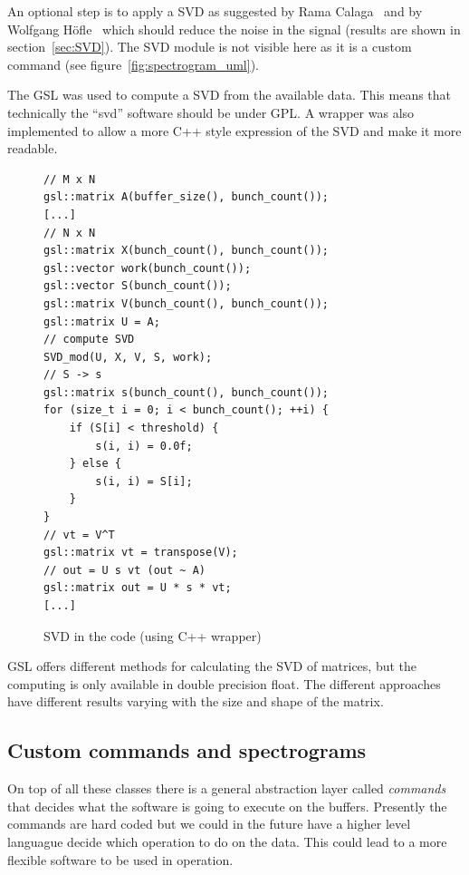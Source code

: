 An optional step is to apply a \gls{SVD} as suggested by Rama Calaga~\cite{PhysRevSTAB.7.042801} and by Wolfgang H{\"o}f\/le~\cite{HofleChamonix12} which should reduce the noise in the signal (results are shown in section~\ref{sec:SVD}). The \gls{SVD} module is not visible here as it is a custom command (see figure~\ref{fig:spectrogram_uml}).

The \gls{GSL} was used to compute a SVD from the available data. This means that technically the ``svd'' software should be under \gls{GPL}. A wrapper was also implemented to allow a more C++ style expression of the \gls{SVD} and make it more readable.

\begin{figure}[H]
\centering
\caption{SVD in the code (using C++ wrapper)}
\begin{lstlisting}
// M x N
gsl::matrix A(buffer_size(), bunch_count());
[...]
// N x N
gsl::matrix X(bunch_count(), bunch_count());
gsl::vector work(bunch_count());
gsl::vector S(bunch_count());
gsl::matrix V(bunch_count(), bunch_count());
gsl::matrix U = A;
// compute SVD
SVD_mod(U, X, V, S, work);
// S -> s
gsl::matrix s(bunch_count(), bunch_count());
for (size_t i = 0; i < bunch_count(); ++i) {
	if (S[i] < threshold) {
		s(i, i) = 0.0f;
	} else {
		s(i, i) = S[i];
	}
}
// vt = V^T
gsl::matrix vt = transpose(V);
// out = U s vt (out ~ A)
gsl::matrix out = U * s * vt;
[...]
\end{lstlisting}
\end{figure}

\Gls{GSL} offers different methods for calculating the \gls{SVD} of matrices, but the computing is only available in double precision float. The different approaches have different results varying with the size and shape of the matrix.

\subsection{Custom commands and spectrograms}

On top of all these classes there is a general abstraction layer called \emph{commands} that decides what the software is going to execute on the buffers. Presently the commands are hard coded but we could in the future have a higher level languague decide which operation to do on the data. This could lead to a more flexible software to be used in operation.

